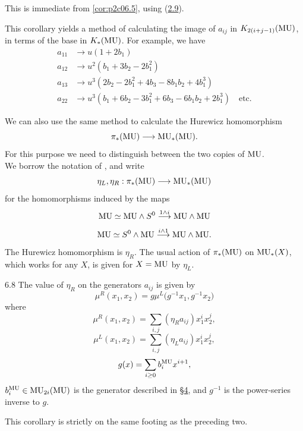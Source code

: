 \documentclass[../main]{subfiles}
\begin{document}
This is immediate from \eqref{cor:p2c06.5}, using (\hyperref[ex:p2c02.9]{2.9}).

This corollary yields a method of calculating the image of $a_{ij}$ in $K_{2(i+j-1)}(\mathrm{MU})$, in terms of the base in $K_\ast(\mathrm{MU})$. For example, we have 
\begin{align*}
    a_{11} &\longrightarrow u(1+2b_1)  \\
    a_{12} &\longrightarrow u^2(b_1+3b_2-2b_1^2)  \\ 
    a_{13} &\longrightarrow u^3(2b_2-2b_1^2+4b_3-8b_1b_2+4b_1^3)  \\
    a_{22} &\longrightarrow u^3(b_1+6b_2-3b_1^2+6b_3-6b_1b_2+2b_1^3) \quad \text{etc.} 
\end{align*}

We can also use the same method to calculate the Hurewicz homomorphism
\[\pi_\ast(\mathrm{MU})\longrightarrow \mathrm{MU}_\ast(\mathrm{MU}).\]
For this purpose we need to distinguish between the two copies of $\mathrm{MU}$.\\
We borrow the notation of \cite{adams3}, and write
\[\eta_L,\eta_R:\pi_\ast(\mathrm{MU})\longrightarrow \mathrm{MU}_\ast(\mathrm{MU})\]
for the homomorphisms induced by the maps
\[\mathrm{MU}\simeq \mathrm{MU}\wedge S^0\overset{1\wedge i}{\longrightarrow} \mathrm{MU}\wedge \mathrm{MU}\]
\[\mathrm{MU}\simeq S^0\wedge \mathrm{MU}\overset{i\wedge 1}{\longrightarrow} \mathrm{MU}\wedge \mathrm{MU}.\]
The Hurewicz homomorphism is $\eta_R$. The usual action of $\pi_\ast(\mathrm{MU})$ on $\mathrm{MU}_\ast(X)$, which works for any $X$, is given for $X=\mathrm{MU}$ by $\eta_L$.
\begin{customcor}{6.8}
\label{cor:p2c06.8}
The value of $\eta_R$ on the generators $a_{ij}$ is given by 
\[\mu^R(x_1,x_2)=g\mu^L\big(g^{-1}x_1,g^{-1}x_2\big)\]
where 
\[\mu^R(x_1,x_2)=\sum_{i,j}(\eta_Ra_{ij})x_1^ix_2^j,\]
\[\mu^L(x_1,x_2)=\sum_{i,j}(\eta_La_{ij})x_1^ix_2^j,\]
\[g(x)=\sum_{i\geq 0}b_i^{\mathrm{MU}}x^{i+1},\]
$b_i^{\mathrm{MU}}\in \mathrm{MU}_{2i}(\mathrm{MU})$ is the generator described in \hyperref[sec:p2c4]{\S 4}, and $g^{-1}$ is the power-series inverse to $g$.
\end{customcor}

This corollary is strictly on the same footing as the preceding two.
\end{document}
